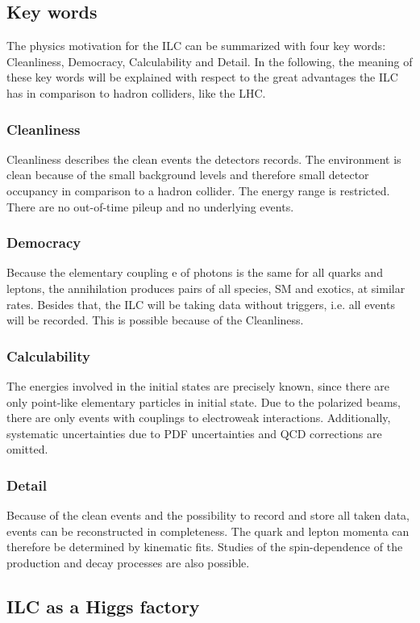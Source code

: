 \subsection{Key words}
The physics motivation for the ILC can be summarized with four key words: Cleanliness, Democracy, Calculability and Detail.
In the following, the meaning of these key words will be explained with respect to the great advantages the ILC has in comparison to hadron colliders, like the LHC.
\subsubsection{Cleanliness}
Cleanliness describes the clean events the detectors records.
The environment is clean because of the small background levels and therefore small detector occupancy in comparison to a hadron collider.
The energy range is restricted.
There are no out-of-time pileup and no underlying events.
\subsubsection{Democracy}
Because the elementary coupling e of photons is the same for all quarks and leptons, the \electron \positron annihilation produces pairs of all species, SM and exotics, at similar rates.
Besides that, the ILC will be taking data without triggers, i.e. all events will be recorded.
This is possible because of the Cleanliness.
\subsubsection{Calculability}
The energies involved in the initial states are precisely known, since there are only point-like elementary particles in initial state.
Due to the polarized beams, there are only events with couplings to electroweak interactions.
Additionally, systematic uncertainties due to PDF uncertainties and QCD corrections are omitted.
\subsubsection{Detail}
Because of the clean events and the possibility to record and store all taken data, events can be reconstructed in completeness.
The quark and lepton momenta can therefore be determined by kinematic fits.
Studies of the spin-dependence of the production and decay processes are also possible.

\subsection{ILC as a Higgs factory}
